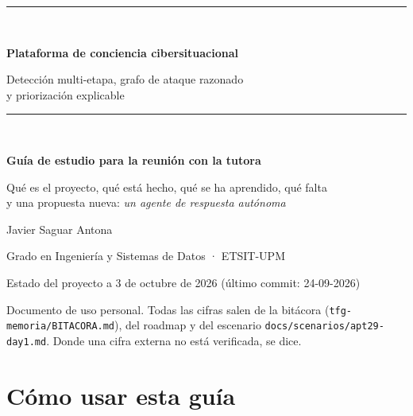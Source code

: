 \documentclass[11pt,a4paper]{article}
\newcommand{\cod}[1]{\texttt{#1}}
\begin{document}
\begin{titlepage}
\centering
\vspace*{2.5cm}
{\color{azul}\rule{\linewidth}{1.2pt}}\\[0.8cm]
{\Huge\bfseries Plataforma de conciencia cibersituacional\par}
\vspace{0.4cm}
{\Large Detección multi-etapa, grafo de ataque razonado\\ y priorización explicable\par}
\vspace{0.8cm}
{\color{azul}\rule{\linewidth}{1.2pt}}\\[1.5cm]
{\LARGE\bfseries Guía de estudio para la reunión con la tutora\par}
\vspace{0.4cm}
{\large Qué es el proyecto, qué está hecho, qué se ha aprendido, qué falta\\
y una propuesta nueva: \textit{un agente de respuesta autónoma}\par}
\vfill
{\large Javier Saguar Antona\par}
{\normalsize Grado en Ingeniería y Sistemas de Datos · ETSIT-UPM\par}
\vspace{0.3cm}
{\normalsize Estado del proyecto a 3 de octubre de 2026 (último commit: 24-09-2026)\par}
\vspace{1.2cm}
\begin{minipage}{0.85\linewidth}
\small\color{gris}
Documento de uso personal. Todas las cifras salen de la bitácora (\cod{tfg-memoria/BITACORA.md}),
del roadmap y del escenario \cod{docs/scenarios/apt29-day1.md}. Donde una cifra externa no está
verificada, se dice.
\end{minipage}
\end{titlepage}

\tableofcontents
\newpage

\section*{Cómo usar esta guía}
\end{document}
